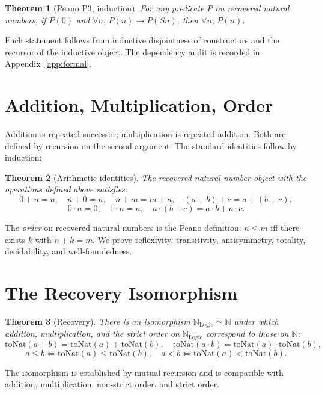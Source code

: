 \documentclass[11pt,a4paper]{article}
\newtheorem{theorem}{Theorem}
\theoremstyle{definition}
\theoremstyle{remark}
\begin{document}
\begin{theorem}[Peano P3, induction]
For any predicate $P$ on recovered natural numbers, if $P(0)$ and
$\forall n,\, P(n) \to P(Sn)$, then $\forall n,\, P(n)$.
\end{theorem}

Each statement follows from inductive disjointness of constructors
and the recursor of the inductive object. The dependency audit is
recorded in Appendix~\ref{app:formal}.

\section{Addition, Multiplication, Order}
\label{sec:operations}

Addition is repeated successor; multiplication is repeated addition.
Both are defined by recursion on the second argument. The standard
identities follow by induction:

\begin{theorem}[Arithmetic identities]
The recovered natural-number object with the operations defined above
satisfies:
\[
0 + n = n, \quad n + 0 = n, \quad
n + m = m + n, \quad (a + b) + c = a + (b + c),
\]
\[
0 \cdot n = 0, \quad 1 \cdot n = n, \quad
a \cdot (b + c) = a \cdot b + a \cdot c.
\]
\end{theorem}

The \emph{order} on recovered natural numbers is the Peano definition:
$n \le m$ iff there exists $k$ with $n + k = m$. We prove
reflexivity, transitivity, antisymmetry, totality, decidability, and
well-foundedness.

\section{The Recovery Isomorphism}
\label{sec:recovery}

\begin{theorem}[Recovery]
There is an isomorphism $\mathbb{N}_{\mathrm{Logic}} \simeq \mathbb{N}$
under which addition, multiplication, and the strict order on
$\mathbb{N}_{\mathrm{Logic}}$ correspond to those on $\mathbb{N}$:
\[
\mathrm{toNat}(a + b) = \mathrm{toNat}(a) + \mathrm{toNat}(b),
\quad
\mathrm{toNat}(a \cdot b) = \mathrm{toNat}(a) \cdot \mathrm{toNat}(b),
\]
\[
a \le b \Leftrightarrow \mathrm{toNat}(a) \le \mathrm{toNat}(b),
\quad
a < b \Leftrightarrow \mathrm{toNat}(a) < \mathrm{toNat}(b).
\]
\end{theorem}

The isomorphism is established by mutual recursion and is compatible
with addition, multiplication, non-strict order, and strict order.
\end{document}
